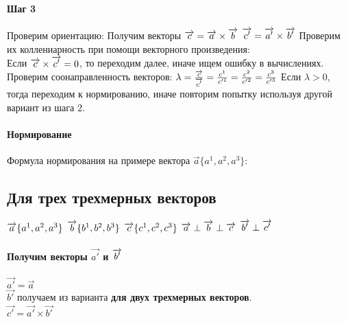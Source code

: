 \documentclass{article}
\begin{document}
\paragraph*{Шаг 3}
Проверим ориентацию:
Получим векторы
$\overrightarrow{c}=\overrightarrow{a}\times\overrightarrow{b}\\$
$\overrightarrow{c'}=\overrightarrow{a'}\times\overrightarrow{b'}\\$
Проверим их коллениарность при помощи векторного произведения:\\
Если $\overrightarrow{c}\times\overrightarrow{c'}=0\\$, то переходим далее, иначе ищем ошибку в вычислениях.\\
Проверим соонаправленность векторов:
$\lambda=\frac{\overrightarrow{c}}{\overrightarrow{c'}}=\frac{c^1}{c'^1}=\frac{c^2}{c'^2}=\frac{c^3}{c'^3}\\$
Если $\lambda > 0$, тогда переходим к нормированию, иначе повторим попытку используя другой вариант из шага 2.\\
\paragraph*{Нормирование}
Формула нормирования на примере вектора $\overrightarrow{a}\{a^1,a^2,a^3\}$:\\
\subsection{Для трех трехмерных векторов}
$\overrightarrow{a}\{a^1,a^2,a^3\}\\$
$\overrightarrow{b}\{b^1,b^2,b^3\}\\$
$\overrightarrow{c}\{c^1,c^2,c^3\}\\$
$\overrightarrow{a}\perp\overrightarrow{b}\perp\overrightarrow{c}\\$
$\overrightarrow{b'}\perp\overrightarrow{c'}\\$\\
\paragraph*{Получим векторы $\overrightarrow{a'}$ и $\overrightarrow{b'}\\$}
$\overrightarrow{a'}=\overrightarrow{a}$\\
$\overrightarrow{b'}$ получаем из варианта \textbf{для двух трехмерных векторов}.\\
$\overrightarrow{c'}=\overrightarrow{a'}\times\overrightarrow{b'}$
\end{document}
